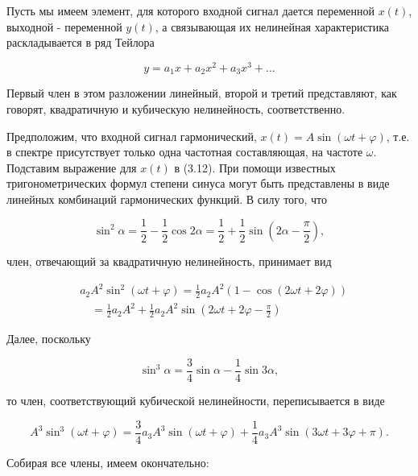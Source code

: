 \documentclass[10pt]{article}
\begin{document}
Пусть мы имеем элемент, для которого входной сигнал дается переменной $x(t)$, выходной - переменной $y(t)$, а связывающая их нелинейная характеристика раскладывается в ряд Тейлора


\begin{equation*}
y=a_{1} x+a_{2} x^{2}+a_{3} x^{3}+\ldots \tag{3.12}
\end{equation*}


Первый член в этом разложении линейный, второй и третий представляют, как говорят, квадратичную и кубическую нелинейность, соответственно.

Предположим, что входной сигнал гармонический, $x(t)=A \sin (\omega t+\varphi)$, т.е. в спектре присутствует только одна частотная составляющая, на частоте $\omega$. Подставим выражение для $x(t)$ в (3.12). При помощи известных тригонометрических формул степени синуса могут быть представлены в виде линейных комбинаций гармонических функций. В силу того, что


\begin{equation*}
\sin ^{2} \alpha=\frac{1}{2}-\frac{1}{2} \cos 2 \alpha=\frac{1}{2}+\frac{1}{2} \sin \left(2 \alpha-\frac{\pi}{2}\right), \tag{3.13}
\end{equation*}


член, отвечающий за квадратичную нелинейность, принимает вид


\begin{align*}
& a_{2} A^{2} \sin ^{2}(\omega t+\varphi)=\frac{1}{2} a_{2} A^{2}(1-\cos (2 \omega t+2 \varphi))  \tag{3.14}\\
& \quad=\frac{1}{2} a_{2} A^{2}+\frac{1}{2} a_{2} A^{2} \sin \left(2 \omega t+2 \varphi-\frac{\pi}{2}\right)
\end{align*}


Далее, поскольку


\begin{equation*}
\sin ^{3} \alpha=\frac{3}{4} \sin \alpha-\frac{1}{4} \sin 3 \alpha, \tag{3.15}
\end{equation*}


то член, соответствующий кубической нелинейности, переписывается в виде


\begin{equation*}
A^{3} \sin ^{3}(\omega t+\varphi)=\frac{3}{4} a_{3} A^{3} \sin (\omega t+\varphi)+\frac{1}{4} a_{3} A^{3} \sin (3 \omega t+3 \varphi+\pi) . \tag{3.16}
\end{equation*}


Собирая все члены, имеем окончательно:
\end{document}
